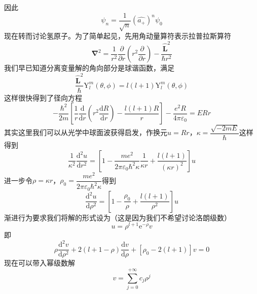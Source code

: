 \documentclass[12pt, a4paper, oneside]{ctexart}
\begin{document}
	\quad\quad 因此
	\begin{equation}
		\psi_{n}=\dfrac{1}{\sqrt{n}}\left(\hat{a_{+}}\right)^{n}\psi_{0}
	\end{equation}
	\quad\quad 现在转而讨论氢原子。为了简单起见，先用角动量算符表示拉普拉斯算符
	\begin{equation}
		\boldsymbol{\nabla}^{2}=\dfrac{1}{r^{2}}\dfrac{\partial}{\partial r}\left(r^{2}\dfrac{\partial}{\partial r}\right)-\dfrac{\boldsymbol{\hat{L}}^{2}}{\hbar r^{2}}
	\end{equation}
	\quad\quad 我们早已知道分离变量解的角向部分是球谐函数，满足
	\begin{equation}
		\dfrac{\boldsymbol{\hat{L}}^{2}}{\hbar}\mathrm{Y}_{l}^{m}(\theta,\phi)=l(l+1)\mathrm{Y}_{l}^{m}(\theta,\phi)
	\end{equation}
	\quad\quad 这样很快得到了径向方程
	\begin{equation}
		-\dfrac{\hbar^{2}}{2m}\left[\dfrac{1}{r}\dfrac{\mathrm{d}}{\mathrm{d}r}\left(r^{2}\dfrac{\mathrm{d}R}{\mathrm{d}r}\right)-\dfrac{l\left(l+1\right)R}{r}\right]-\dfrac{e^{2}R}{4\pi\varepsilon_{0}}=ERr
	\end{equation}
	\quad\quad 其实这里我们可以从光学中球面波获得启发，作换元$u=Rr$，$\kappa=\dfrac{\sqrt{-2mE}}{\hbar}$这样得到
	\begin{equation}
		\dfrac{1}{\kappa^{2}}\dfrac{\mathrm{d}^{2}u}{\mathrm{d}r^{2}}=\left[1-\dfrac{me^{2}}{2\pi\varepsilon_{0}\hbar^{2}\kappa}\dfrac{1}{\kappa r}+\dfrac{l\left(l+1\right)}{\left(\kappa r\right)^{2}}\right]u
	\end{equation}
	\quad\quad 进一步令$\rho=\kappa r$，$\rho_{0}=\dfrac{me^{2}}{2\pi\varepsilon_{0}\hbar^{2}\kappa}$得到
	\begin{equation}
		\dfrac{\mathrm{d}^{2}u}{\mathrm{d}\rho^{2}}=\left[1-\dfrac{\rho_{0}}{\rho}+\dfrac{l\left(l+1\right)}{\rho^{2}}\right]u
	\end{equation}
	\quad\quad 渐进行为要求我们将解的形式设为（这是因为我们不希望讨论洛朗级数）
	\begin{equation}
		u=\rho^{l+1}\mathrm{e}^{-\rho}v
	\end{equation}
	\quad\quad 即
	\begin{equation}
		\rho\dfrac{\mathrm{d}^{2}v}{\mathrm{d}\rho^{2}}+2(l+1-\rho)\dfrac{\mathrm{d}v}{\mathrm{d}\rho}+\left[\rho_{0}-2(l+1)\right]v=0
	\end{equation}
	\quad\quad 现在可以带入幂级数解
	\begin{equation}
		v=\sum_{j=0}^{+\infty}c_{j}\rho^{j}
	\end{equation}
\end{document}
